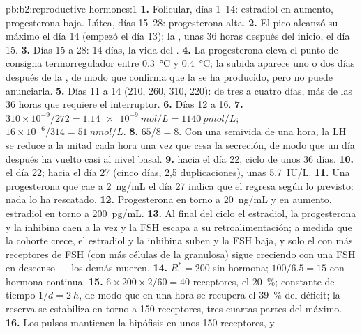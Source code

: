 \begin{solution}{pb:b2:reproductive-hormones:1}
\textbf{1.} Folicular, días 1--14: estradiol en aumento, progesterona
baja. Lútea, días 15--28: progesterona alta.
\textbf{2.} El pico alcanzó su máximo el día 14 (empezó el día 13); la
, unas 36 horas después del inicio, el día 15.
\textbf{3.} Días 15 a 28: 14 días, la vida del .
\textbf{4.} La progesterona eleva el punto de consigna termorregulador
entre \qty{0.3}{\celsius} y \qty{0.4}{\celsius}; la subida aparece uno o
dos días después de la , de modo que confirma que la 
se ha producido, pero no puede anunciarla.
\textbf{5.} Días 11 a 14 (210, 260, 310, 220): de tres a cuatro días, más
de las 36 horas que requiere el interruptor.
\textbf{6.} Días 12 a 16.
\textbf{7.} $310\times 10^{-9}/272 = \qty{1.14e-9}{mol/L} =
\qty{1140}{pmol/L}$; $16\times 10^{-6}/314 = \qty{51}{nmol/L}$.
\textbf{8.} $65/8 = 8$. Con una semivida de una hora, la LH se reduce a la
mitad cada hora una vez que cesa la secreción, de modo que un día después
ha vuelto casi al nivel basal.
\textbf{9.}  hacia el día 22, ciclo de unos 36 días.
\textbf{10.}  el día 22; hacia el día 27 (cinco días, 2,5
duplicaciones), unas \qty{5.7}{IU/L}.
\textbf{11.} Una progesterona que cae a \qty{2}{ng/mL} el día 27 indica que
el  regresa según lo previsto: nada lo ha rescatado.
\textbf{12.} Progesterona en torno a \qty{20}{ng/mL} y en aumento,
estradiol en torno a \qty{200}{pg/mL}.
\textbf{13.} Al final del ciclo el estradiol, la progesterona y la inhibina
caen a la vez y la FSH escapa a su retroalimentación; a medida que la
cohorte crece, el estradiol y la inhibina suben y la FSH baja, y solo el
 con más receptores de FSH (con más células de la granulosa)
sigue creciendo con una FSH en descenso --- los demás mueren.
\textbf{14.} $R^* = 200$ sin hormona; $100/6.5 = 15$ con hormona
continua.
\textbf{15.} $6\times 200\times 2/60 = 40$ receptores, el \qty{20}{\%};
constante de tiempo $1/d = \qty{2}{h}$, de modo que en una hora se
recupera el \qty{39}{\%} del déficit; la reserva se estabiliza en torno a
150 receptores, tres cuartas partes del máximo.
\textbf{16.} Los pulsos mantienen la hipófisis en unos 150 receptores, y

\end{solution}
